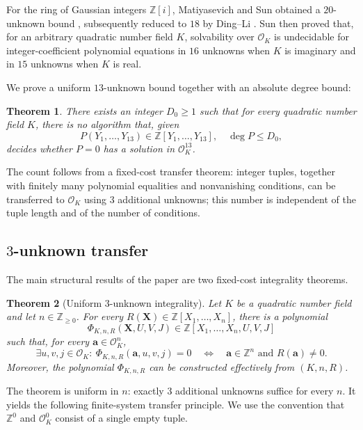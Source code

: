 \documentclass[12pt]{amsart}
\numberwithin{equation}{section}
\newtheorem{theorem}{Theorem}[section]
\theoremstyle{remark}
\theoremstyle{plain}
\newcommand{\Z}{\mathbb{Z}}
\newcommand{\sO}{\mathcal{O}}
\newcommand{\bX}{\mathbf{X}}
\newcommand{\ba}{\mathbf{a}}
\begin{document}
For the ring of Gaussian integers $\Z[i]$, Matiyasevich and Sun obtained a $20$-unknown bound \cite{MS27}, subsequently reduced to $18$ by Ding--Li \cite{DingLi26}. Sun \cite[Theorems~1.1 and~1.2]{Sun26} then proved that, for an arbitrary quadratic number field $K$, solvability over $\sO_K$ is undecidable for integer-coefficient polynomial equations in $16$ unknowns when $K$ is imaginary and in $15$ unknowns when $K$ is real.

We prove a uniform $13$-unknown bound together with an absolute degree bound:
\begin{theorem}\label{thm:bd13}
There exists an integer $D_0\geq1$ such that for every quadratic number field $K$, there is no algorithm that, given
\[
P(Y_1,\ldots,Y_{13})\in\Z[Y_1,\ldots,Y_{13}],\quad \deg P\leq D_0,
\]
decides whether $P=0$ has a solution in $\sO_K^{13}$.
\end{theorem}

The count follows from a fixed-cost transfer theorem: integer tuples, together with finitely many polynomial equalities and nonvanishing conditions, can be transferred to $\sO_K$ using $3$ additional unknowns; this number is independent of the tuple length and of the number of conditions.

\subsection{$3$-unknown transfer}
The main structural results of the paper are two fixed-cost integrality theorems.
\begin{theorem}[Uniform $3$-unknown integrality]\label{thm:uniform3}
Let $K$ be a quadratic number field and let $n\in\Z_{\geq0}$. For every
$R(\bX)\in\Z[X_1,\ldots,X_n]$, there is a polynomial
\[
\Phi_{K,n,R}(\bX,U,V,J)\in\Z[X_1,\ldots,X_n,U,V,J]
\]
such that, for every $\ba\in\sO_K^n$,
\[
\exists u,v,j\in\sO_K\colon\ \Phi_{K,n,R}(\ba,u,v,j)=0\quad\Longleftrightarrow\quad\ba\in\Z^n\text{ and }R(\ba)\neq0.
\]
Moreover, the polynomial $\Phi_{K,n,R}$ can be constructed effectively from $(K,n,R)$.
\end{theorem}
The theorem is uniform in $n$: exactly $3$ additional unknowns suffice for every $n$. It yields the following finite-system transfer principle. We use the convention that $\Z^0$ and $\sO_K^0$ consist of a single empty tuple.
\end{document}
